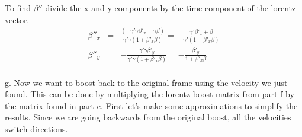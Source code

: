 \documentclass[11pt]{amsart}
\begin{document}
To find $\beta''$ divide the x and y components by the time component of the lorentz vector. \\
\begin{eqnarray*}
\beta''_{x} &=& \frac{(-\gamma'\gamma\beta'_{x}-\gamma\beta)}{\gamma'\gamma(1+\beta'_{x}\beta)} = -\frac{\gamma'\beta'_{x}+\beta}{\gamma'(1+\beta'_{x}\beta)} \\
\beta''_{y} &=& -\frac{\gamma'\gamma\beta'_{y}}{\gamma'\gamma(1+\beta'_{x}\beta)} = -\frac{\beta'_{y}}{1+\beta'_{x}\beta} 
\end{eqnarray*} \\
g. Now we want to boost back to the original frame using the velocity we just found. This can be done by multiplying the lorentz boost matrix from part f by the matrix found in part e. First let's make some approximations to simplify the results. Since we are going backwards from the original boost, all the velocities switch directions. \\
\end{document}
